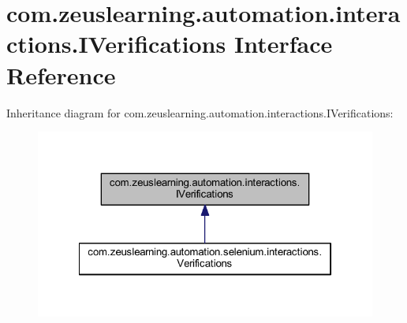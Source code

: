 \hypertarget{interfacecom_1_1zeuslearning_1_1automation_1_1interactions_1_1IVerifications}{}\section{com.\+zeuslearning.\+automation.\+interactions.\+I\+Verifications Interface Reference}
\label{interfacecom_1_1zeuslearning_1_1automation_1_1interactions_1_1IVerifications}


Inheritance diagram for com.\+zeuslearning.\+automation.\+interactions.\+I\+Verifications\+:\nopagebreak
\begin{figure}[H]
\begin{center}
\leavevmode
\includegraphics[width=322pt]{d8/d5f/interfacecom_1_1zeuslearning_1_1automation_1_1interactions_1_1IVerifications__inherit__graph}
\end{center}
\end{figure}
